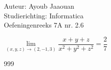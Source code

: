 \documentclass[a4paper]{article}
\newcommand{\llim}{\lim\limits}
\begin{document}
\noindent \large Auteur: Ayoub Jaaouan \\
\noindent \large Studierichting: Informatica\\
\noindent \large Oefeningenreeks 7A nr. 2.6\\
\medskip

\normalsize


$\llim_{(x,y,z) \rightarrow (2,-1,3)}\dfrac{x+y+z}{x^2+y^2+z^2}= \dfrac{2}{7}$\\

\begin{thebibliography}{999}
\end{thebibliography}
\end{document}
